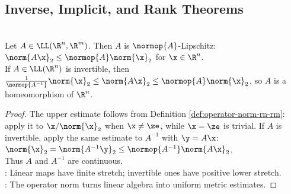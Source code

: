 \subsection{Inverse, Implicit, and Rank Theorems}

%

\begin{theorem} \label{thm:finite-dimensional-linear-maps-lipschitz-homeomorphisms} \\
Let $A\in\LL(\R^n,\R^m)$. Then $A$ is $\normop{A}$-Lipschitz: $\norm{A\x}_2\leq\normop{A}\norm{\x}_2$ for $\x\in\R^n$.\\
If $A\in\LL(\R^n)$ is invertible, then $\frac{1}{\normop{A^{-1}}}\norm{\x}_2\leq\norm{A\x}_2\leq\normop{A}\norm{\x}_2$, so $A$ is a homeomorphism of $\R^n$.
\begin{proof}
The upper estimate follows from Definition \ref{def:operator-norm-rn-rm}: apply it to $\x/\norm{\x}_2$ when $\x\neq\ze$, while $\x=\ze$ is trivial. If $A$ is invertible, apply the same estimate to $A^{-1}$ with $\y=A\x$: $\norm{\x}_2=\norm{A^{-1}\y}_2\leq\normop{A^{-1}}\norm{A\x}_2$.\\
Thus $A$ and $A^{-1}$ are continuous.\\
: Linear maps have finite stretch; invertible ones have positive lower stretch.\\
: The operator norm turns linear algebra into uniform metric estimates.
\end{proof}
\end{theorem}

